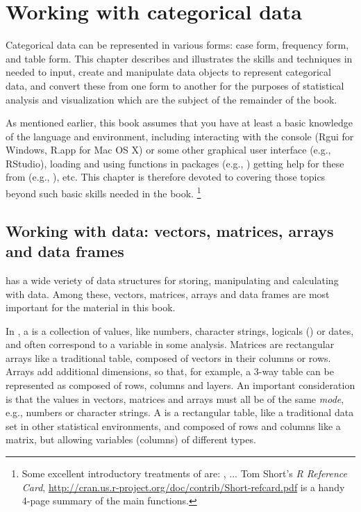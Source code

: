 

\chapter{Working with categorical data}\label{ch:working}

Categorical data can be represented in various forms:
case form, frequency form, and table form.  This chapter
describes and illustrates the skills and techniques in \R
needed to input, create and manipulate \R data objects
to represent categorical data, and convert these from one
form to another for the purposes of statistical analysis
and visualization which are the subject of the remainder of the book.

As mentioned earlier, this book assumes that you have at least a
basic knowledge of the \R language and environment, including
interacting with the \R console (Rgui for Windows, R.app for Mac OS X)
or some other graphical user interface (e.g., RStudio),
loading and using \R functions in packages (e.g., )
getting help for these from \R (e.g., ), etc.
This chapter is therefore devoted
to covering those topics beyond such basic skills needed in the book.%
\footnote{
Some excellent introductory treatments of \R are:
\citet[]{FoxWeisberg:2011}, ...
Tom Short's \emph{R Reference Card}, \url{http://cran.us.r-project.org/doc/contrib/Short-refcard.pdf} is a handy 4-page summary of the main functions.
}


\section{Working with \R data: vectors, matrices, arrays and data frames}\label{sec:Rdata}

\R has a wide veriety of data structures for storing, manipulating and
calculating with data.  Among these, vectors, matrices, arrays and
data frames are most important for the material in this book. 

In \R, a  is a collection of values, like numbers, character strings, logicals () 
or dates, and often correspond to a variable in some analysis.
Matrices are rectangular arrays like a traditional table, composed of vectors in their columns
or rows.  
Arrays add additional dimensions, so that, for example, a 3-way table can be represented
as composed of rows, columns and layers.
An important consideration is that the values in vectors,
matrices and arrays must all be of the same \emph{mode}, e.g., numbers or character strings.
A  is a rectangular table, like a traditional data set in other
statistical environments, and composed of rows and columns like a matrix,
but allowing variables (columns) of different types.

